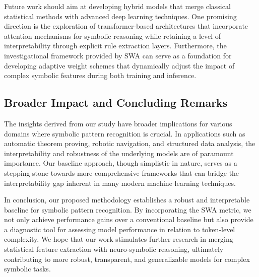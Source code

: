 \documentclass{article}
\begin{document}
Future work should aim at developing hybrid models that merge classical statistical methods with advanced deep learning techniques. One promising direction is the exploration of transformer-based architectures that incorporate attention mechanisms for symbolic reasoning while retaining a level of interpretability through explicit rule extraction layers. Furthermore, the investigational framework provided by SWA can serve as a foundation for developing adaptive weight schemes that dynamically adjust the impact of complex symbolic features during both training and inference.

\subsection{Broader Impact and Concluding Remarks}
The insights derived from our study have broader implications for various domains where symbolic pattern recognition is crucial. In applications such as automatic theorem proving, robotic navigation, and structured data analysis, the interpretability and robustness of the underlying models are of paramount importance. Our baseline approach, though simplistic in nature, serves as a stepping stone towards more comprehensive frameworks that can bridge the interpretability gap inherent in many modern machine learning techniques.

In conclusion, our proposed methodology establishes a robust and interpretable baseline for symbolic pattern recognition. By incorporating the SWA metric, we not only achieve performance gains over a conventional baseline but also provide a diagnostic tool for assessing model performance in relation to token-level complexity. We hope that our work stimulates further research in merging statistical feature extraction with neuro-symbolic reasoning, ultimately contributing to more robust, transparent, and generalizable models for complex symbolic tasks.
\end{document}

